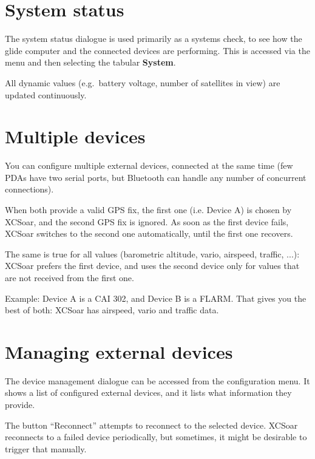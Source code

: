 \section{System status}\label{sec:system-status}

The system status dialogue is
used primarily as a systems check, to see how the glide computer and the 
connected devices are performing.  This is accessed via the menu 
and then selecting the tabular \textbf{System}.

All dynamic values (e.g.\ battery voltage, number of satellites in
view) are updated continuously.

\section{Multiple devices}

You can configure multiple external devices, connected at the same
time (few PDAs have two serial ports, but Bluetooth can handle any
number of concurrent connections).

When both provide a valid GPS fix, the first one (i.e. Device A) is chosen by
XCSoar, and the second GPS fix is ignored.  As soon as the first device fails,
XCSoar switches to the second one automatically, until the first one recovers.

The same is true for all values (barometric altitude, vario, airspeed,
traffic, ...): XCSoar prefers the first device, and uses the second
device only for values that are not received from the first one.

Example: Device A is a CAI 302, and Device B is a FLARM.
That gives you the best of both: XCSoar has airspeed, vario and
traffic data.


\section{Managing external devices}

The device management dialogue can be accessed from the configuration
menu. It shows a list of configured external devices,
and it lists what information they provide.

The button ``Reconnect'' attempts to reconnect to the selected
device.  XCSoar reconnects to a failed device periodically, but
sometimes, it might be desirable to trigger that manually.


